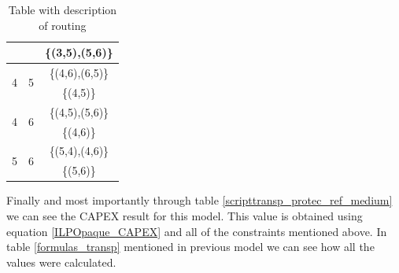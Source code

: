 \begin{table}[h!]
\begin{tabular}{|| c | c | c ||}
 & & \{(3,5),(5,6)\} \\ \hline
 \multirow{2}{*}{4} & \multirow{2}{*}{5} & \{(4,6),(6,5)\} \\
 & & \{(4,5)\} \\ \hline
 \multirow{2}{*}{4} & \multirow{2}{*}{6} & \{(4,5),(5,6)\} \\
 & & \{(4,6)\} \\ \hline
 \multirow{2}{*}{5} & \multirow{2}{*}{6} & \{(5,4),(4,6)\} \\
 & & \{(5,6)\} \\
 \hline
\end{tabular}
\caption{Table with description of routing}
\label{path_transp_protec_ref_medium}
\end{table}


Finally and most importantly through table \ref{scripttransp_protec_ref_medium} we can see the CAPEX result for this model. This value is obtained using equation \ref{ILPOpaque_CAPEX} and all of the constraints mentioned above. In table \ref{formulas_transp} mentioned in previous model we can see how all the values were calculated.\\

